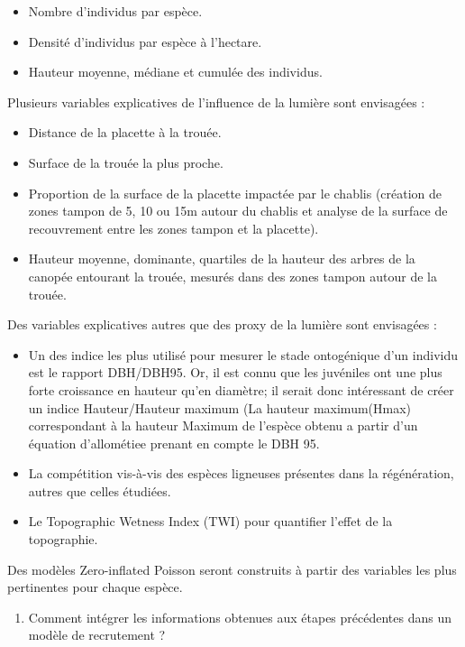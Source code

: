 \documentclass[
  12pt,
  american,
  a4paper,
  extrafontsizes,onecolumn,openright
  ]{memoir}
\providecommand{\tightlist}{%
  \setlength{\itemsep}{0pt}\setlength{\parskip}{0pt}}
\newlength{\rf}
\begin{document}
\begin{itemize}
\item
  Nombre d'individus par espèce.
\item
  Densité d'individus par espèce à l'hectare.
\item
  Hauteur moyenne, médiane et cumulée des individus.
\end{itemize}

Plusieurs variables explicatives de l'influence de la lumière sont envisagées :

\begin{itemize}
\item
  Distance de la placette à la trouée.
\item
  Surface de la trouée la plus proche.
\item
  Proportion de la surface de la placette impactée par le chablis (création de zones tampon de 5, 10 ou 15m autour du chablis et analyse de la surface de recouvrement entre les zones tampon et la placette).
\item
  Hauteur moyenne, dominante, quartiles de la hauteur des arbres de la canopée entourant la trouée, mesurés dans des zones tampon autour de la trouée.
\end{itemize}

Des variables explicatives autres que des proxy de la lumière sont envisagées :

\begin{itemize}
\item
  Un des indice les plus utilisé pour mesurer le stade ontogénique d'un individu est le rapport DBH/DBH95. Or, il est connu que les juvéniles ont une plus forte croissance en hauteur qu'en diamètre; il serait donc intéressant de créer un indice Hauteur/Hauteur maximum (La hauteur maximum(Hmax) correspondant à la hauteur Maximum de l'espèce obtenu a partir d'un équation d'allométiee prenant en compte le DBH 95.
\item
  La compétition vis-à-vis des espèces ligneuses présentes dans la régénération, autres que celles étudiées.
\item
  Le Topographic Wetness Index (TWI) pour quantifier l'effet de la topographie.
\end{itemize}

Des modèles Zero-inflated Poisson seront construits à partir des variables les plus pertinentes pour chaque espèce.

\begin{enumerate}
\def\labelenumi{\arabic{enumi})}
\setcounter{enumi}{1}
\tightlist
\item
  Comment intégrer les informations obtenues aux étapes précédentes dans un modèle de recrutement ?
\end{enumerate}
\end{document}
